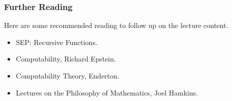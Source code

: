 \documentclass{beamer}
\begin{document}
\begin{frame}
	\frametitle{Further Reading}
	
	Here are some recommended reading to follow up on the lecture content.
	
	\vspace{0.5cm}
	
	\begin{itemize}
		\item SEP: Recursive Functions. 
		\item Computability, Richard Epstein. 
		\item Computability Theory, Enderton.
		\item Lectures on the Philosophy of Mathematics, Joel Hamkins.		
	\end{itemize}
	
\end{frame}
\end{document}
